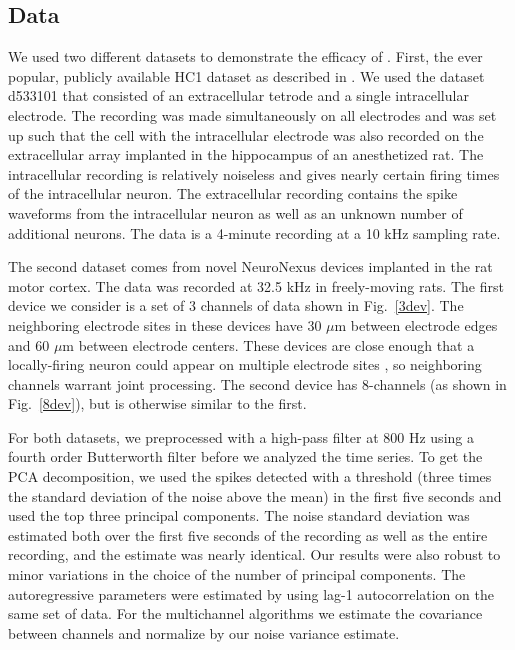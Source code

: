 
\subsection{Data}

We used two different datasets to demonstrate the efficacy of \smug.  First, the ever popular, publicly available HC1 dataset %
as described in \cite{Henze2000}.  We used the dataset d533101 that consisted of an extracellular tetrode and a single intracellular electrode.  The recording was made simultaneously on all electrodes and was set up such that the cell with the intracellular electrode was also recorded on the extracellular array implanted in the hippocampus of an anesthetized rat. The intracellular recording is relatively noiseless and gives nearly certain firing times of the intracellular neuron.  The extracellular recording contains the spike waveforms from the intracellular neuron as well as an unknown number of additional neurons.  The data is a 4-minute recording at a 10 kHz sampling rate.  

The second dataset comes from novel NeuroNexus devices implanted in the rat motor cortex.  The data was recorded at 32.5 kHz in freely-moving rats.  The first device we consider is a set of 3 channels of data shown in Fig.\ \ref{3dev}.  The neighboring electrode sites in these devices have 30 $\mu$m between electrode edges and 60 $\mu$m between electrode centers.  These devices are close enough that a locally-firing neuron could appear on multiple electrode sites \cite{Prentice2011}, so neighboring channels warrant joint processing.  The second device has 8-channels (as shown in Fig.\ \ref{8dev}), but is otherwise similar to the first.



For both datasets, we preprocessed with a high-pass filter at 800 Hz using a fourth order Butterworth filter before we analyzed the time series.  To get the PCA decomposition, we used the spikes detected with a threshold (three times the standard deviation of the noise above the mean) in the first five seconds and used the top three principal components.  The noise standard deviation was estimated both over the first five seconds of the recording as well as the entire recording, and the estimate was nearly identical.  Our results were also robust to minor variations in the choice of the number of principal components.  The autoregressive parameters were estimated by using lag-1 autocorrelation on the same set of data.  For the multichannel algorithms we estimate the covariance between channels and normalize by our noise variance estimate.

